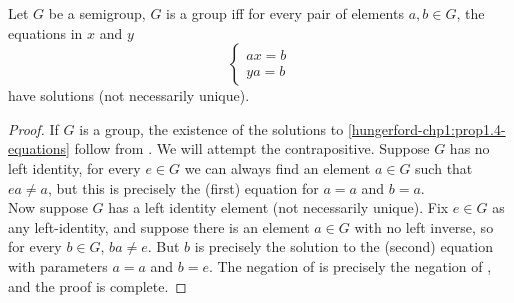 \documentclass[../main-manifolds.tex]{subfiles}
\begin{document}
\begin{wts}\label{hungerford-chp1:prop1.4}
    Let $G$ be a semigroup, $G$ is a group iff for every pair of elements $a,b\in G$, the equations in $x$ and $y$
    \begin{equation}\label{hungerford-chp1:prop1.4-equations}
        \begin{cases}
            ax=b\\
            ya=b
        \end{cases}
    \end{equation}
    have solutions (not necessarily unique).
\end{wts}
\begin{proof}
    If $G$ is a group, the existence of the solutions to \cref{hungerford-chp1:prop1.4-equations} follow from . We will attempt the contrapositive. Suppose $G$ has no left identity, for every $e\in G$ we can always find an element $a\in G$ such that $ea\neq a$, but this is precisely the (first) equation for $a=a$ and $b=a$. \\

    Now suppose $G$ has a left identity element (not necessarily unique). Fix $e\in G$ as any left-identity, and suppose there is an element $a\in G$ with no left inverse, so for every $b\in G$, $ba\neq e$. But $b$ is precisely the solution to the (second) equation with parameters $a=a$ and $b=e$. The negation of  is precisely the negation of , and the proof is complete.
\end{proof}
\end{document}
